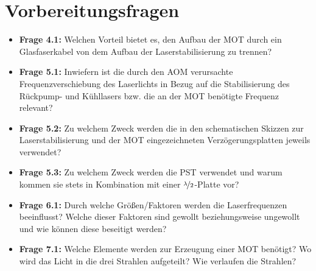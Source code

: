 \documentclass[
class=book,
accentcolor=1b,
custommargins=geometry,
fontsize=11pt,
thesis={type=Versuchsanleitung},
ruledheaders=all,
headline=false,
instbox=false,
marginpar=false,
title=small,
ignore-missing-data=true,
twoside=false,
logofile=apqdesign/tuda_logo.pdf,
pdfa=false %
]{apqpub}
\begin{document}
					\section{Vorbereitungsfragen}
					\begin{itemize}
						\item \textbf{Frage 4.1:} Welchen Vorteil bietet es, den Aufbau der MOT durch ein Glasfaserkabel von dem Aufbau der Laserstabilisierung zu trennen?		
						\item \textbf{Frage 5.1:} Inwiefern ist die durch den AOM verursachte Frequenzverschiebung des Laserlichts in Bezug auf die Stabilisierung des Rückpump- und Kühllasers bzw. die an der MOT benötigte Frequenz relevant?
						\item \textbf{Frage 5.2:} Zu welchem Zweck werden die in den schematischen Skizzen zur Laserstabilisierung und der MOT eingezeichneten Verzögerungsplatten jeweils verwendet?
						\item \textbf{Frage 5.3:} Zu welchem Zweck werden die PST verwendet und warum kommen sie stets in Kombination mit einer $\nicefrac{\lambda}{2}$-Platte vor? 
						\item \textbf{Frage 6.1:} Durch welche Größen/Faktoren werden die Laserfrequenzen beeinflusst? Welche dieser Faktoren sind gewollt beziehungsweise ungewollt und wie können diese beseitigt werden?
						\item \textbf{Frage 7.1:} Welche Elemente werden zur Erzeugung einer MOT benötigt? Wo wird das Licht in die drei Strahlen aufgeteilt? Wie verlaufen die Strahlen?
					\end{itemize}
					
\end{document}
